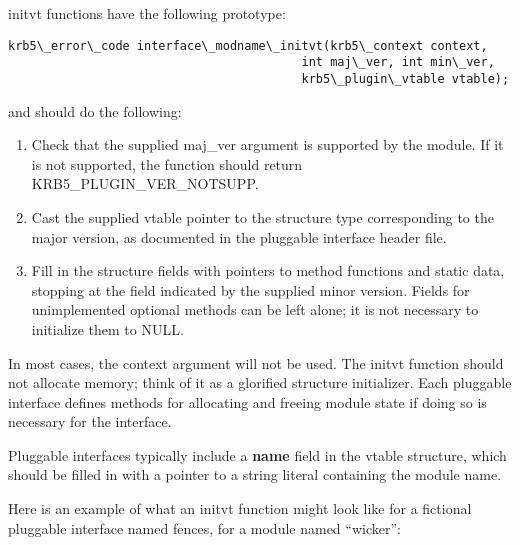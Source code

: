 \documentclass[letterpaper,10pt,english]{sphinxmanual}
\begin{document}
initvt functions have the following prototype:

\begin{Verbatim}[commandchars=\\\{\}]
krb5\_error\_code interface\_modname\_initvt(krb5\_context context,
                                         int maj\_ver, int min\_ver,
                                         krb5\_plugin\_vtable vtable);
\end{Verbatim}

and should do the following:
\begin{enumerate}
\item {} 
Check that the supplied maj\_ver argument is supported by the
module.  If it is not supported, the function should return
KRB5\_PLUGIN\_VER\_NOTSUPP.

\item {} 
Cast the supplied vtable pointer to the structure type
corresponding to the major version, as documented in the pluggable
interface header file.

\item {} 
Fill in the structure fields with pointers to method functions and
static data, stopping at the field indicated by the supplied minor
version.  Fields for unimplemented optional methods can be left
alone; it is not necessary to initialize them to NULL.

\end{enumerate}

In most cases, the context argument will not be used.  The initvt
function should not allocate memory; think of it as a glorified
structure initializer.  Each pluggable interface defines methods for
allocating and freeing module state if doing so is necessary for the
interface.

Pluggable interfaces typically include a \textbf{name} field in the vtable
structure, which should be filled in with a pointer to a string
literal containing the module name.

Here is an example of what an initvt function might look like for a
fictional pluggable interface named fences, for a module named
``wicker'':
\end{document}

